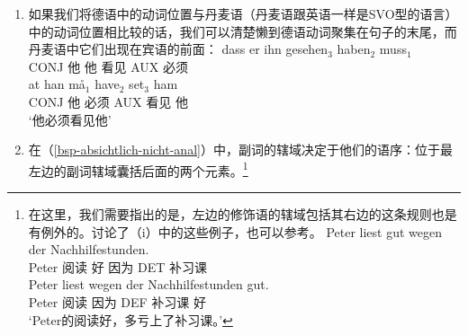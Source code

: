 \begin{enumerate}
\addlines[-1]
\item 如果我们将德语中的动词位置与丹麦语（丹麦语跟英语一样是SVO型的语言）中的动词位置相比较的话，我们可以清楚懒到德语动词聚集在句子的末尾，而丹麦语中它们出现在宾语的前面\citep[]{Oersnes2009b}：
\eal
\ex 
\gll dass er ihn gesehen$_3$ haben$_2$ muss$_1$\\
	 CONJ 他 他 看见 AUX 必须\\
\ex 
\gll at han må$_1$ have$_2$ set$_3$ ham\\
     CONJ 他 必须 AUX 看见 他\\
\glt `他必须看见他'
\zl
\pagebreak
\item\label{SOV-Skopus} 在（\ref{bsp-absichtlich-nicht-anal}）中，副词的辖域决定于他们的语序：位于最左边的副词辖域囊括后面的两个元素。\footnote{%
在这里，我们需要指出的是，左边的修饰语的辖域包括其右边的这条规则也是有例外的。\citet*[]{Kasper94a}讨论了（i）中的这些例子，也可以参考\citet*[]{BV72}。
\eal
\label{bsp-peter-liest-gut-wegen}
\ex 
\gll Peter liest gut wegen der Nachhilfestunden.\\
	 Peter 阅读 好 因为 DET 补习课\\
\ex 
\gll Peter liest wegen der Nachhilfestunden gut.\\
	 Peter 阅读 因为 DEF 补习课 好\\
\glt `Peter的阅读好，多亏上了补习课。'
}
\end{enumerate}
